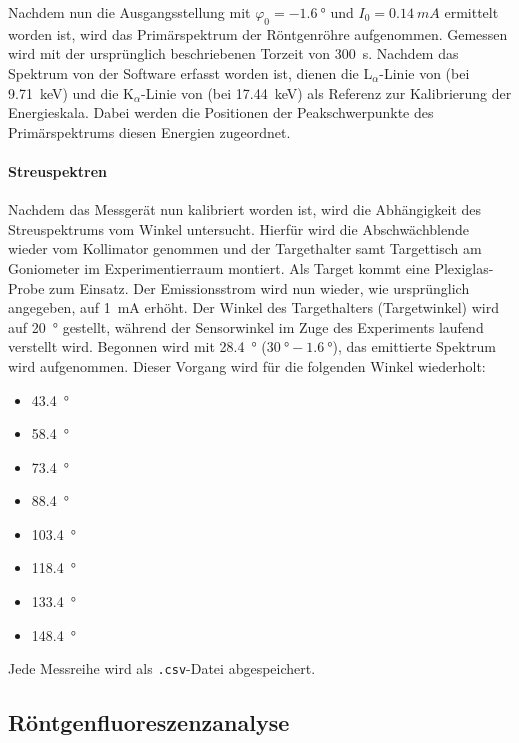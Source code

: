 \documentclass[ngerman]{scrartcl}
\begin{document}
Nachdem nun die Ausgangsstellung mit $\varphi_0 = \SI{-1.6}{\degree}$ und $I_0=\SI{0.14}{mA}$ ermittelt worden ist, wird das Primärspektrum der Röntgenröhre aufgenommen. Gemessen wird mit der ursprünglich beschriebenen Torzeit von \SI{300}{s}. Nachdem das Spektrum von der Software erfasst worden ist, dienen die L$_\alpha$-Linie von  (bei \SI{9.71}{keV}) und die K$_\alpha$-Linie von  (bei \SI{17.44}{keV}) als Referenz zur Kalibrierung der Energieskala. Dabei werden die Positionen der Peakschwerpunkte des Primärspektrums diesen Energien zugeordnet.

\paragraph{Streuspektren}
Nachdem das Messgerät nun kalibriert worden ist, wird die Abhängigkeit des Streuspektrums vom Winkel untersucht. Hierfür wird die Abschwächblende wieder vom Kollimator genommen und der Targethalter samt Targettisch am Goniometer im Experimentierraum montiert. Als Target kommt eine Plexiglas-Probe zum Einsatz. Der Emissionsstrom wird nun wieder, wie ursprünglich angegeben, auf \SI{1}{mA} erhöht. Der Winkel des Targethalters (Targetwinkel) wird auf \SI{20}{\degree} gestellt, während der Sensorwinkel im Zuge des Experiments laufend verstellt wird. Begonnen wird mit \SI{28.4}{\degree} ($\SI{30}{\degree} - \SI{1.6}{\degree}$), das emittierte Spektrum wird aufgenommen. Dieser Vorgang wird für die folgenden Winkel wiederholt:
\begin{itemize}
    \item \SI{43.4}{\degree}
    \item \SI{58.4}{\degree}
    \item \SI{73.4}{\degree}
    \item \SI{88.4}{\degree}
    \item \SI{103.4}{\degree}
    \item \SI{118.4}{\degree}
    \item \SI{133.4}{\degree}
    \item \SI{148.4}{\degree}
\end{itemize}
Jede Messreihe wird als \texttt{.csv}-Datei abgespeichert.


\subsection{Röntgenfluoreszenzanalyse}
\label{subsec:durchfuehrung_fluoreszenz}
\end{document}
